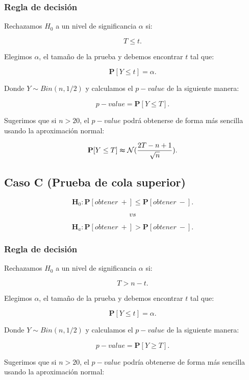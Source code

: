 \documentclass[
  a4paper,
  oneside,
  openany]{book}
\begin{document}
\hypertarget{regla-de-decisiuxf3n-11}{%
\subsubsection*{Regla de decisión}\label{regla-de-decisiuxf3n-11}}


Rechazamos \(H_0\) a un nivel de significancia \(\alpha\) si:

\[T \leq t.\]

Elegimos \(\alpha\), el tamaño de la prueba y debemos encontrar \(t\) tal que:

\[\mathbf{P}[Y \leq t]=\alpha.\]

Donde \(Y \sim Bin (n,1/2)\) y calculamos el \(p-value\) de la siguiente manera:

\[p-value=\mathbf{P}[Y\leq T].\]

Sugerimos que si \(n>20\), el \(p-value\) podrá obtenerse de forma más sencilla usando la aproximación normal:

\[\mathbf{P}[Y\leq T] \thickapprox  \mathcal{N} (\frac{2T-n+1}{\sqrt{n}}).\]

\hypertarget{caso-c-prueba-de-cola-superior-3}{%
\subsection*{Caso C (Prueba de cola superior)}\label{caso-c-prueba-de-cola-superior-3}}


\[\textbf{H}_0: \mathbf{P}[obtener\ +] \leq \mathbf{P}[obtener\ -].\]

\[vs\]

\[\textbf{H}_a: \mathbf{P}[obtener\ +] > \mathbf{P}[obtener\ -].\]

\hypertarget{regla-de-decisiuxf3n-12}{%
\subsubsection*{Regla de decisión}\label{regla-de-decisiuxf3n-12}}


Rechazamos \(H_0\) a un nivel de significancia \(\alpha\) si:

\[T > n-t.\]

Elegimos \(\alpha\), el tamaño de la prueba y debemos encontrar \(t\) tal que:

\[\mathbf{P}[Y \leq t]=\alpha.\]

Donde \(Y \sim Bin (n,1/2)\) y calculamos el \(p-value\) de la siguiente manera:

\[p-value=\mathbf{P}[Y\geq T].\]

Sugerimos que si \(n > 20\), el \(p-value\) podría obtenerse de forma más sencilla usando la aproximación normal:
\end{document}
